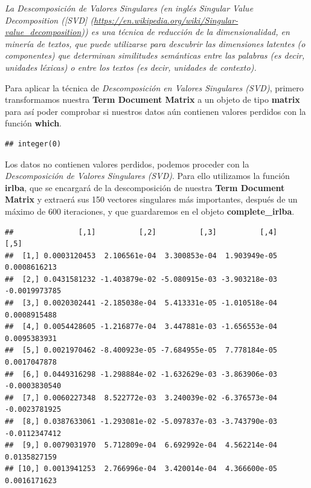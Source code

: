 \documentclass[
]{article}
\newenvironment{Shaded}{\begin{snugshade}}{\end{snugshade}}
\newcommand{\DataTypeTok}[1]{\textcolor[rgb]{0.13,0.29,0.53}{#1}}
\newcommand{\DecValTok}[1]{\textcolor[rgb]{0.00,0.00,0.81}{#1}}
\newcommand{\KeywordTok}[1]{\textcolor[rgb]{0.13,0.29,0.53}{\textbf{#1}}}
\newcommand{\NormalTok}[1]{#1}
\newcommand{\OperatorTok}[1]{\textcolor[rgb]{0.81,0.36,0.00}{\textbf{#1}}}
\newcommand{\StringTok}[1]{\textcolor[rgb]{0.31,0.60,0.02}{#1}}
\begin{document}
\emph{La Descomposición de Valores Singulares (en inglés Singular Value
Decomposition ({[}SVD{]}
(\url{https://en.wikipedia.org/wiki/Singular-value_decomposition})) es
una técnica de reducción de la dimensionalidad, en minería de textos,
que puede utilizarse para descubrir las dimensiones latentes (o
componentes) que determinan similitudes semánticas entre las palabras
(es decir, unidades léxicas) o entre los textos (es decir, unidades de
contexto).}

Para aplicar la técnica de \emph{Descomposición en Valores Singulares
(SVD)}, primero transformamos nuestra \textbf{Term Document Matrix} a un
objeto de tipo \textbf{matrix} para así poder comprobar si nuestros
datos aún contienen valores perdidos con la función \textbf{which}.

\begin{verbatim}
## integer(0)
\end{verbatim}

Los datos no contienen valores perdidos, podemos proceder con la
\emph{Descomposición de Valores Singulares (SVD)}. Para ello utilizamos
la función \textbf{irlba}, que se encargará de la descomposición de
nuestra \textbf{Term Document Matrix} y extraerá sus 150 vectores
singulares más importantes, después de un máximo de 600 iteraciones, y
que guardaremos en el objeto \textbf{complete\_irlba}.

\begin{Shaded}
\end{Shaded}

\begin{verbatim}
##               [,1]          [,2]          [,3]          [,4]          [,5]
##  [1,] 0.0003120453  2.106561e-04  3.300853e-04  1.903949e-05  0.0008616213
##  [2,] 0.0431581232 -1.403879e-02 -5.080915e-03 -3.903218e-03 -0.0019973785
##  [3,] 0.0020302441 -2.185038e-04  5.413331e-05 -1.010518e-04  0.0008915488
##  [4,] 0.0054428605 -1.216877e-04  3.447881e-03 -1.656553e-04  0.0095383931
##  [5,] 0.0021970462 -8.400923e-05 -7.684955e-05  7.778184e-05  0.0017047878
##  [6,] 0.0449316298 -1.298884e-02 -1.632629e-03 -3.863906e-03 -0.0003830540
##  [7,] 0.0060227348  8.522772e-03  3.240039e-02 -6.376573e-04 -0.0023781925
##  [8,] 0.0387633061 -1.293081e-02 -5.097837e-03 -3.743790e-03 -0.0112347412
##  [9,] 0.0079031970  5.712809e-04  6.692992e-04  4.562214e-04  0.0135827159
## [10,] 0.0013941253  2.766996e-04  3.420014e-04  4.366600e-05  0.0016171623
\end{verbatim}
\end{document}
